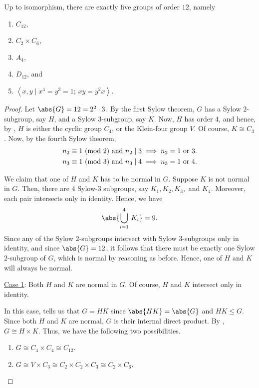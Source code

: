 \begin{theorem} \label{thm:class-12}
    Up to isomorphism, there are exactly five groups of order $12$, namely
    \begin{enumerate}
        \item $C_{12}$,
        \item $C_2 \times C_6$,
        \item $A_4$,
        \item $D_{12}$, and
        \item $\left\langle x,y \mid x^4=y^3=1; \, xy =y^2x \right\rangle$.
    \end{enumerate}
\end{theorem}
\begin{proof}
    Let $\abs{G} = 12 = 2^2 \cdot 3$. By the first Sylow theorem, $G$ has a Sylow $2$-subgroup, say $H$, and a Sylow $3$-subgroup, say $K$. Now, $H$ has order $4$, and hence, by , $H$ is either the cyclic group $C_4$, or the Klein-four group $V$. Of course, $K \cong C_3$. Now, by the fourth Sylow theorem,
    \begin{align*}
        n_2 &\equiv 1 \ (\mathrm{mod}\ 2) \text{ and } n_2 \mid 3 \implies n_2 = 1 \text{ or } 3. \\
        n_3 &\equiv 1 \ (\mathrm{mod}\ 3) \text{ and } n_3 \mid 4 \implies n_3 = 1 \text{ or } 4.
    \end{align*}
    
    We claim that one of $H$ and $K$ has to be normal in $G$. Suppose $K$ is not normal in $G$. Then, there are $4$ Sylow-$3$ subgroups, say $K_1, K_2, K_3,$ and $K_4$. Moreover, each pair intersects only in identity. Hence, we have
    \[
        \abs{\bigcup_{i=1}^4 \, K_i} = 9.
    \]
    Since any of the Sylow $2$-subgroups intersect with Sylow $3$-subgroups only in identity, and since $\abs{G} = 12$, it follows that there must be exactly one Sylow $2$-subgroup of $G$, which is normal by reasoning as before. Hence, one of $H$ and $K$ will always be normal. 
    
    \underline{Case 1}: Both $H$ and $K$ are normal in $G$. Of course, $H$ and $K$ intersect only in identity. 
    
    In this case,  tells us that $G = HK$ since $\abs{HK} = \abs{G}$ and $HK \leq G$. Since both $H$ and $K$ are normal, $G$ is their internal direct product. By , $G \cong H \times K$. Thus, we have the following two possibilities.
    \begin{enumerate}
        \item $G \cong C_4 \times C_4 \cong C_{12}$.
        \item $G \cong V \times C_3 \cong C_2 \times C_2 \times C_3 \cong C_2 \times C_6$.
    \end{enumerate}
    

\end{proof}
